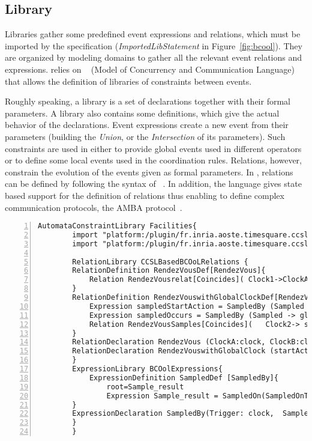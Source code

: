\subsection{Library}
\label{subsec:bcoollib}

Libraries gather some predefined event expressions and relations, which must be imported by the specification (\emph{ImportedLibStatement} in Figure~\ref{fig:bcool}). They are organized by modeling domains to gather all the relevant event relations and expressions. \bcool relies on \moccml~\cite{moccmlbib} (Model of Concurrency and Communication Language) that allows the definition of libraries of constraints between events.

Roughly speaking, a \moccml library is a set of declarations together with their formal parameters. A library also contains some definitions, which give the actual behavior of the declarations. Event expressions create a new event from their parameters (\eg building the \textit{Union}, or the \textit{Intersection} of its parameters). Such constraints are used in \bcool either to provide global events used in different operators or to define some local events used in the coordination rules. Relations, however, constrain the evolution of the events given as formal parameters. In \moccml, relations can be defined by following the syntax of \ccsl~\cite{ccslbib}. In addition, the language gives state based support for the definition of relations thus enabling to define complex communication protocols, \eg the AMBA protocol~\cite{ambabus}.



\begin{lstlisting}[language=moccml,
		caption={Facilities Library in \moccml},
		label={lst:moccmllib}, 
		basicstyle=\scriptsize\ttfamily, backgroundcolor=\color{LGrey}, numbers=left, xleftmargin=2pt]
		AutomataConstraintLibrary Facilities{ 
		import "platform:/plugin/fr.inria.aoste.timesquare.ccslkernel.model/ccsllibrary/kernel.ccslLib" as kernel;
		import "platform:/plugin/fr.inria.aoste.timesquare.ccslkernel.model/ccsllibrary/CCSL.ccslLib" as CCSLLib;
		
		RelationLibrary CCSLBasedBCOoLRelations {
		RelationDefinition RendezVousDef[RendezVous]{ 
			Relation RendezVousrelat[Coincides]( Clock1->ClockA, Clock2->ClockB)
		}
		RelationDefinition RendezVouswithGlobalClockDef[RendezVouswithGlobalClock]{ 
			Expression sampledStartAction = SampledBy (Sampled -> globalClock, Trigger-> startAction)
			Expression sampledOccurs = SampledBy (Sampled -> globalClock, Trigger-> occurs)
			Relation RendezVousSamples[Coincides](   Clock2-> sampledStartAction , Clock1-> sampledOccurs  )
		}
		RelationDeclaration RendezVous (ClockA:clock, ClockB:clock) 
		RelationDeclaration RendezVouswithGlobalClock (startAction: clock , occurs: clock, globalClock: clock )
		}
		ExpressionLibrary BCOolExpressions{
			ExpressionDefinition SampledDef [SampledBy]{
				root=Sample_result 
				Expression Sample_result = SampledOn(SampledOnTrigger -> Trigger, SampledOnSampledClock ->Sampled)
		}
		ExpressionDeclaration SampledBy(Trigger: clock,  Sampled: clock):clock
		}	
		}
\end{lstlisting}

